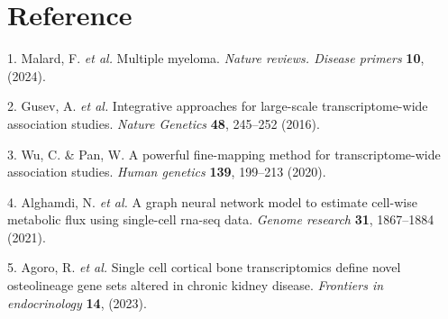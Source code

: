 \documentclass[
]{article}
\newenvironment{cslreferences}%
  {}%
  {\par}
\begin{document}
\begin{center}\vspace{1.5cm}\end{center}

\hypertarget{bibliography}{%
\section*{Reference}\label{bibliography}}

\hypertarget{refs}{}
\begin{cslreferences}
\leavevmode\hypertarget{ref-MultipleMyelomMalard2024}{}%
1. Malard, F. \emph{et al.} Multiple myeloma. \emph{Nature reviews. Disease primers} \textbf{10}, (2024).

\leavevmode\hypertarget{ref-IntegrativeAppGusev2016}{}%
2. Gusev, A. \emph{et al.} Integrative approaches for large-scale transcriptome-wide association studies. \emph{Nature Genetics} \textbf{48}, 245--252 (2016).

\leavevmode\hypertarget{ref-APowerfulFineWuCh2020}{}%
3. Wu, C. \& Pan, W. A powerful fine-mapping method for transcriptome-wide association studies. \emph{Human genetics} \textbf{139}, 199--213 (2020).

\leavevmode\hypertarget{ref-AGraphNeuralAlgham2021}{}%
4. Alghamdi, N. \emph{et al.} A graph neural network model to estimate cell-wise metabolic flux using single-cell rna-seq data. \emph{Genome research} \textbf{31}, 1867--1884 (2021).

\leavevmode\hypertarget{ref-SingleCellCorAgoro2023}{}%
5. Agoro, R. \emph{et al.} Single cell cortical bone transcriptomics define novel osteolineage gene sets altered in chronic kidney disease. \emph{Frontiers in endocrinology} \textbf{14}, (2023).
\end{cslreferences}
\end{document}
